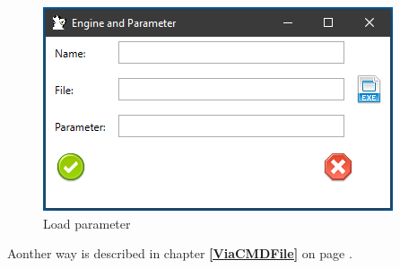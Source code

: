\documentclass[11pt,a4paper]{article}
\begin{document}
\begin{figure}[H]
	\centering
	\includegraphics[scale=1.0]{loadEngine3.png}
	\caption{Load parameter}
	\label{fig:LoadEngine4}
\end{figure}
Aonther way is described in chapter \textbf{\ref{ViaCMDFile}  } on page \pageref{ViaCMDFile}.\\
\end{document}
